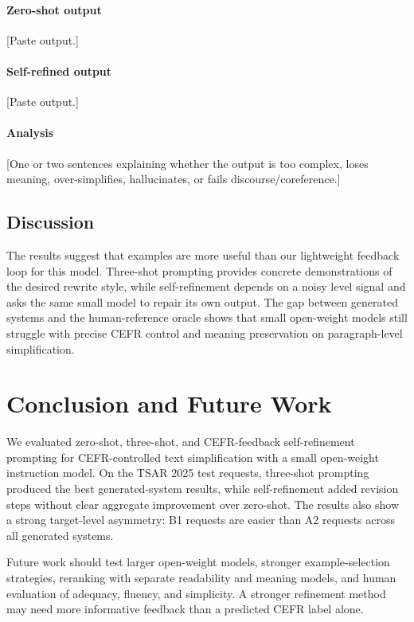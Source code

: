 \documentclass[11pt]{article}
\begin{document}
\paragraph{Zero-shot output}
[Paste output.]

\paragraph{Self-refined output}
[Paste output.]

\paragraph{Analysis}
[One or two sentences explaining whether the output is too complex, loses meaning, over-simplifies, hallucinates, or fails discourse/coreference.]

\subsection{Discussion}

The results suggest that examples are more useful than our lightweight feedback loop for this model. Three-shot prompting provides concrete demonstrations of the desired rewrite style, while self-refinement depends on a noisy level signal and asks the same small model to repair its own output. The gap between generated systems and the human-reference oracle shows that small open-weight models still struggle with precise CEFR control and meaning preservation on paragraph-level simplification.

\section{Conclusion and Future Work}

We evaluated zero-shot, three-shot, and CEFR-feedback self-refinement prompting for CEFR-controlled text simplification with a small open-weight instruction model. On the TSAR 2025 test requests, three-shot prompting produced the best generated-system results, while self-refinement added revision steps without clear aggregate improvement over zero-shot. The results also show a strong target-level asymmetry: B1 requests are easier than A2 requests across all generated systems.

Future work should test larger open-weight models, stronger example-selection strategies, reranking with separate readability and meaning models, and human evaluation of adequacy, fluency, and simplicity. A stronger refinement method may need more informative feedback than a predicted CEFR label alone.
\end{document}
